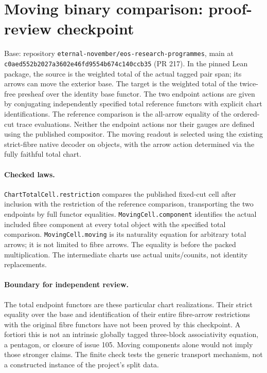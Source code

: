 \section*{Moving binary comparison: proof-review checkpoint}
Base: repository \texttt{eternal-november/eos-research-programmes}, main at
\texttt{c0aed552b2027a3602e46fd9554b674c140ccb35} (PR 217).
In the pinned Lean package, the source is the weighted total of the actual tagged
pair span; its arrows can move the exterior base. The target is the weighted
total of the twice-free presheaf over the identity base functor. The two
endpoint actions are given by conjugating independently specified total
reference functors with explicit chart identifications. The reference comparison
is the all-arrow equality of the ordered-cut trace evaluations. Neither the
endpoint actions nor their gauges are defined using the published compositor.
The moving readout is selected using the existing strict-fibre native decoder
on objects, with the arrow action determined via the fully faithful total chart.

\paragraph{Checked laws.}
\texttt{ChartTotalCell.restriction} compares the published fixed-cut cell after
inclusion with the restriction of the reference comparison, transporting the
two endpoints by full functor equalities. \texttt{MovingCell.component}
identifies the actual included fibre component at every total object with
the specified total comparison. \texttt{MovingCell.moving} is its naturality
equation for arbitrary total arrows; it is not limited to fibre arrows.
The equality is before the packed multiplication. The intermediate charts use
actual units/counits, not identity replacements.

\paragraph{Boundary for independent review.} The total endpoint functors are
these particular chart realizations. Their strict equality over the base
and identification of their entire fibre-arrow restrictions with the original
fibre functors have not been proved by this checkpoint. A fortiori this is
not an intrinsic globally tagged three-block associativity equation, a
pentagon, or closure of issue 105. Moving components alone would not imply
those stronger claims. The finite check tests the generic transport mechanism,
not a constructed instance of the project's split data.

